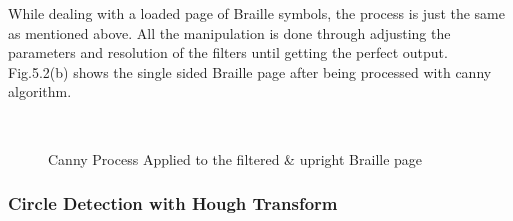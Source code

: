 While dealing with a loaded page of Braille symbols, the process is just the same as mentioned above. All the manipulation is done through adjusting the parameters and resolution of the filters until getting the perfect output. Fig.5.2(b) shows the single sided Braille page after being processed with canny algorithm.
\begin{figure}[H]
    \centering
    \hfill
    \\
    \caption{Canny Process Applied to the filtered \& upright Braille page}
    \label{fig:num2}
\end{figure}




\subsubsection{Circle Detection with Hough Transform}


